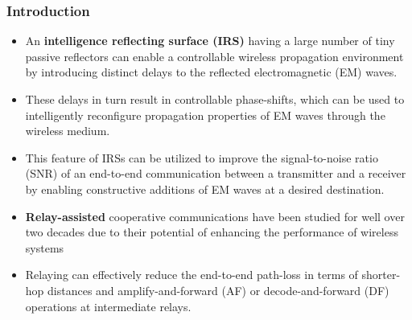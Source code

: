 \documentclass[article,mathserif,10pt,envcountsect]{beamer}
\begin{document}
\begin{frame}
\frametitle{Introduction}
\begin{itemize}
	\item An \alert{\bf intelligence reflecting surface (IRS)} having a large number of tiny passive reflectors can enable a controllable wireless propagation environment by introducing distinct delays to the reflected  electromagnetic (EM) waves.
	
	\item These delays in turn result in controllable phase-shifts, which   can be used to intelligently reconfigure propagation properties of EM waves through the wireless medium. 
	
	\item This feature of IRSs can be utilized to improve the signal-to-noise ratio (SNR) of an end-to-end communication between a transmitter and a receiver by enabling constructive additions of EM waves at a desired destination.
	
	\item \alert{\bf Relay-assisted} cooperative communications  have been  studied for well over two decades due to their potential of enhancing the performance of wireless systems
	
	\item Relaying can effectively reduce the end-to-end path-loss in terms of shorter-hop distances and amplify-and-forward (AF) or decode-and-forward (DF) operations at intermediate relays.


\end{itemize} 
	

\end{frame}
\end{document}

